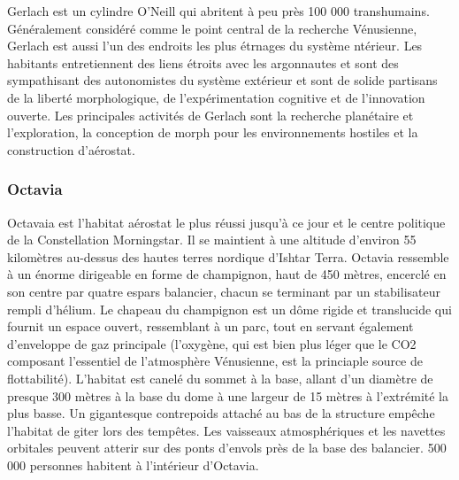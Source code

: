                                                       Gerlach est un cylindre O'Neill qui abritent à peu près 100 000 transhumains. Généralement considéré comme le point central de la recherche Vénusienne, Gerlach est aussi l'un des endroits les plus étrnages du système ntérieur. Les habitants entretiennent des liens étroits avec les argonnautes et sont des sympathisant des autonomistes du système extérieur et sont de solide partisans de la liberté morphologique, de l'expérimentation cognitive et de l'innovation ouverte. Les principales activités de Gerlach sont la recherche planétaire et l'exploration, la conception de morph pour les environnements hostiles et la construction d'aérostat. 

                                                      \subsubsection{Octavia} \label{sec:octavia} 

                                                      Octavaia est l'habitat aérostat le plus réussi jusqu'à ce jour et le centre politique de la Constellation Morningstar. Il se maintient à une altitude d'environ 55 kilomètres au-dessus des hautes terres nordique d'Ishtar Terra. Octavia ressemble à un énorme dirigeable en forme de champignon, haut de 450 mètres, encerclé en son centre par quatre espars balancier, chacun se terminant par un stabilisateur rempli d'hélium. Le chapeau du champignon est un dôme rigide et translucide qui fournit un espace ouvert, ressemblant à un parc, tout en servant également d'enveloppe de gaz principale (l'oxygène, qui est bien plus léger que le CO2 composant l'essentiel de l'atmosphère Vénusienne, est la princiaple source de flottabilité). L'habitat est canelé du sommet à la base, allant d'un diamètre de presque 300 mètres à la base du dome à une largeur de 15 mètres à l'extrémité la plus basse. Un gigantesque contrepoids attaché au bas de la structure empêche l'habitat de giter lors des tempêtes. Les vaisseaux atmosphériques et les navettes orbitales peuvent atterir sur des ponts d'envols près de la base des balancier. 500 000 personnes habitent à l'intérieur d'Octavia. 

